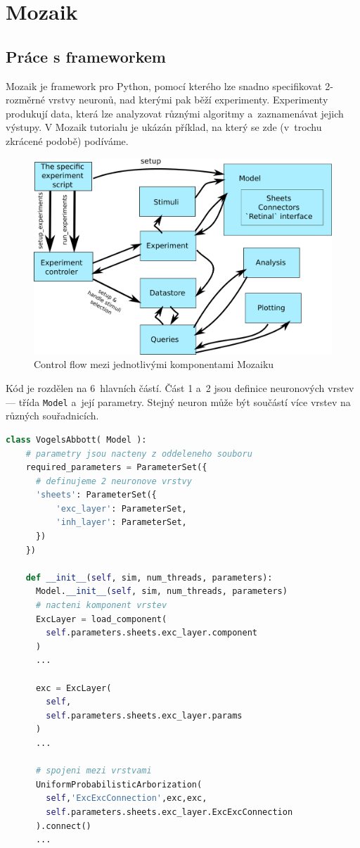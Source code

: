 \chapter{Mozaik}
\label{chap:mozaik}
\section{Práce s frameworkem}

Mozaik je framework pro Python, pomocí kterého lze snadno specifikovat 2-rozměrné vrstvy neuronů, nad kterými pak běží experimenty. Experimenty produkují data, která lze analyzovat různými algoritmy a~zaznamenávat jejich výstupy. V Mozaik tutorialu\cite{MozaikTutorial} je ukázán příklad, na který se zde (v~trochu zkrácené podobě) podíváme.

\begin{figure}
  \centering
  \includegraphics[width=.6\linewidth]{img/mozaik_control_flow.png}
  \caption{Control flow mezi jednotlivými komponentami Mozaiku\cite{MozaikIntroduction}}
\end{figure}

Kód je rozdělen na 6~hlavních částí. Část 1 a~2 jsou definice neuronových vrstev --- třída \lstinline|Model| a~její parametry. Stejný neuron může být součástí více vrstev na různých souřadnicích.

\begin{lstlisting}[language=Python]
  class VogelsAbbott( Model ):
    # parametry jsou nacteny z oddeleneho souboru
    required_parameters = ParameterSet({
      # definujeme 2 neuronove vrstvy
      'sheets': ParameterSet({
          'exc_layer': ParameterSet,
          'inh_layer': ParameterSet, 
      })
    })

    def __init__(self, sim, num_threads, parameters):
      Model.__init__(self, sim, num_threads, parameters)
      # nacteni komponent vrstev
      ExcLayer = load_component(
        self.parameters.sheets.exc_layer.component
      )
      ...
      
      exc = ExcLayer(
        self, 
        self.parameters.sheets.exc_layer.params
      )
      ...

      # spojeni mezi vrstvami
      UniformProbabilisticArborization(
        self,'ExcExcConnection',exc,exc,
        self.parameters.sheets.exc_layer.ExcExcConnection
      ).connect()
      ...
\end{lstlisting}

